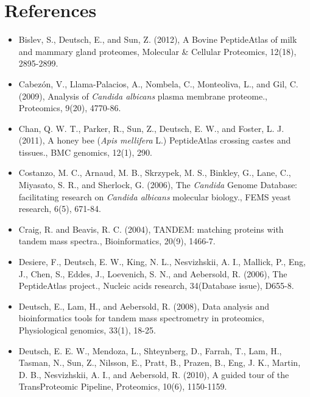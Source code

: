 \section*{References}


\begin{itemize}[leftmargin=*]

\item[]{
Bislev, S., Deutsch, E., and Sun, Z. (2012), A Bovine PeptideAtlas of milk and mammary gland
proteomes, Molecular \& Cellular Proteomics, 12(18), 2895-2899.
}

\item[]{
Cabez\'on, V., Llama-Palacios, A., Nombela, C., Monteoliva, L., and Gil, C. (2009), Analysis of
\textit{Candida albicans} plasma membrane proteome., Proteomics, 9(20), 4770-86.
}

\item[]{
Chan, Q. W. T., Parker, R., Sun, Z., Deutsch, E. W., and Foster, L. J. (2011), A honey bee
(\textit{Apis mellifera} L.) PeptideAtlas crossing castes and tissues., BMC genomics, 12(1), 290.
}

\item[]{
Costanzo, M. C., Arnaud, M. B., Skrzypek, M. S., Binkley, G., Lane, C., Miyasato, S. R., and
Sherlock, G. (2006), The \textit{Candida} Genome Database: facilitating research on 
\textit{Candida albicans} molecular biology., FEMS yeast research, 6(5), 671-84.
}

\item[]{
Craig, R. and Beavis, R. C. (2004), TANDEM: matching proteins with tandem mass spectra.,
Bioinformatics, 20(9), 1466-7.
}

\item[]{
Desiere, F., Deutsch, E. W., King, N. L., Nesvizhskii, A. I., Mallick, P., Eng, J., Chen, S., Eddes,
J., Loevenich, S. N., and Aebersold, R. (2006), The PeptideAtlas project., Nucleic acids
research, 34(Database issue), D655-8.
}

\item[]{
Deutsch, E., Lam, H., and Aebersold, R. (2008), Data analysis and bioinformatics tools for
tandem mass spectrometry in proteomics, Physiological genomics, 33(1), 18-25.
}

\item[]{
Deutsch, E. E. W., Mendoza, L., Shteynberg, D., Farrah, T., Lam, H., Tasman, N., Sun, Z.,
Nilsson, E., Pratt, B., Prazen, B., Eng, J. K., Martin, D. B., Nesvizhskii, A. I., and Aebersold,
R. (2010), A guided tour of the TransProteomic Pipeline, Proteomics, 10(6), 1150-1159.
}


\end{itemize}
